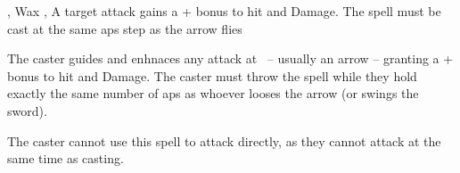   {\mEarth,\mFire}%
  {Wax}%
  {\detailed,\distant}%
  {}%
  {A target attack gains a + bonus to hit and Damage. The spell must be cast at the same \glspl{ap} step as the arrow flies}%
  {
    The caster guides and enhnaces any attack at \spellRange\ -- usually an arrow -- granting a + bonus to hit and Damage.
    The caster must throw the spell while they hold exactly the same number of \glspl{ap} as whoever looses the arrow (or swings the sword).

    The caster cannot use this spell to attack directly, as they cannot attack at the same time as casting.
  }
